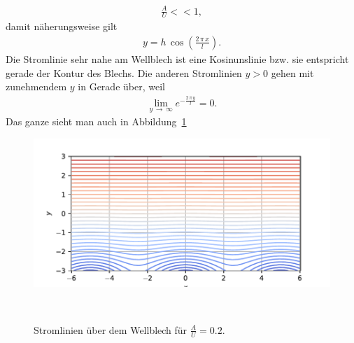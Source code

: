 \begin{align*}
    \frac{A}{U} << 1,
\end{align*}
damit näherungsweise gilt
\begin{align*}
    y
    =
    h\,\cos\left(\frac{2\,\pi\,x}{l}\right).
\end{align*}
Die Stromlinie sehr nahe am Wellblech ist eine
Kosinunslinie bzw. sie entspricht gerade der Kontur
des Blechs.
Die anderen Stromlinien $y > 0$ gehen mit zunehmendem $y$
in Gerade über, weil
\begin{align*}
    \lim_{y\,\to\,\infty}
    e^{-\frac{2\,\pi\,y}{l}}
    =
    0.
\end{align*}
Das ganze sieht man auch in Abbildung~\ref{fig:stromlinien}
\begin{figure}
    \centering
    \includegraphics[width=\textwidth]{papers/ueberschall/figures/Stromlinien.pdf}
    \caption{Stromlinien über dem Wellblech für $\frac{A}{U}=0.2$.}
    ~\label{fig:stromlinien}  
\end{figure}

